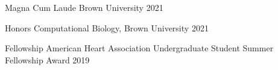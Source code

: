 


\begin{cvhonors}

  \cvhonor
    {Magna Cum Laude} %
    {Brown University} %
    {2021} %

  \cvhonor
    {Honors} %
    {Computational Biology, Brown University} %
    {2021} %

  \cvhonor
    {Fellowship} %
    {American Heart Association Undergraduate Student Summer Fellowship Award} %
    {2019} %

\end{cvhonors}




